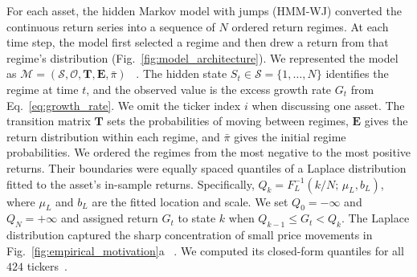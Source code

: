 

For each asset, the hidden Markov model with jumps (HMM-WJ) converted
the continuous return series into a
sequence of $N$ ordered return regimes. At each time step, the model
first selected a regime and then drew a return from that regime's
distribution (Fig.~\ref{fig:model_architecture}). We represented the model as
$\mathcal{M} = (\mathcal{S}, \mathcal{O}, \mathbf{T}, \mathbf{E}, \bar{\pi})$
~\cite{rabinerJuang1986}.
The hidden state $S_t \in \mathcal{S} = \{1,\dots,N\}$ identifies the
regime at time $t$, and the observed value is the excess growth rate
$G_t$ from Eq.~\eqref{eq:growth_rate}. We omit the ticker index
$i$ when discussing one asset. The transition matrix $\mathbf{T}$
sets the probabilities of moving between regimes, $\mathbf{E}$ gives
the return distribution within each regime, and $\bar{\pi}$ gives the
initial regime probabilities. We ordered the regimes from the most
negative to the most positive
returns. Their boundaries were equally spaced quantiles of a Laplace
distribution fitted to the asset's in-sample returns. Specifically,
$Q_k = F_L^{-1}(k/N;\, \mu_L, b_L)$, where $\mu_L$ and $b_L$ are the
fitted location and scale. We set $Q_0=-\infty$ and $Q_N=+\infty$ and
assigned return $G_t$ to state $k$ when $Q_{k-1}\le G_t<Q_k$. The
Laplace distribution captured the sharp concentration of small price
movements in Fig.~\ref{fig:empirical_motivation}a
~\cite{kotzKozubowskiPodgorski2001, tothJones2019}. We computed its
closed-form quantiles for all $424$ tickers~\cite{bilmes1998}.

